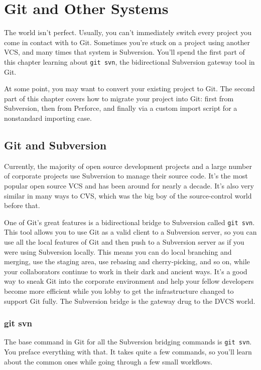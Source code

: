 \documentclass[a4paper]{book}
\newcommand{\chap}[1]{\newpage\thispagestyle{empty}\chapter{#1}\label{chap:\thechapter}}
\begin{document}
\chap{Git and Other Systems}\label{git-and-other-systems}

The world isn't perfect. Usually, you can't immediately switch every project you come in contact with to Git. Sometimes you're stuck on a project using another VCS, and many times that system is Subversion. You'll spend the first part of this chapter learning about \texttt{git svn}, the bidirectional Subversion gateway tool in Git.

At some point, you may want to convert your existing project to Git. The second part of this chapter covers how to migrate your project into Git: first from Subversion, then from Perforce, and finally via a custom import script for a nonstandard importing case.

\section{Git and Subversion}\label{git-and-subversion}

Currently, the majority of open source development projects and a large number of corporate projects use Subversion to manage their source code. It's the most popular open source VCS and has been around for nearly a decade. It's also very similar in many ways to CVS, which was the big boy of the source-control world before that.

One of Git's great features is a bidirectional bridge to Subversion called \texttt{git svn}. This tool allows you to use Git as a valid client to a Subversion server, so you can use all the local features of Git and then push to a Subversion server as if you were using Subversion locally. This means you can do local branching and merging, use the staging area, use rebasing and cherry-picking, and so on, while your collaborators continue to work in their dark and ancient ways. It's a good way to sneak Git into the corporate environment and help your fellow developers become more efficient while you lobby to get the infrastructure changed to support Git fully. The Subversion bridge is the gateway drug to the DVCS world.

\subsection{git svn}\label{git-svn}

The base command in Git for all the Subversion bridging commands is \texttt{git svn}. You preface everything with that. It takes quite a few commands, so you'll learn about the common ones while going through a few small workflows.
\end{document}
